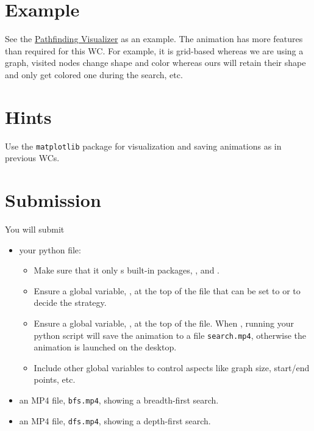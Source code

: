 \documentclass[a4paper]{exam}
\begin{document}
\section*{Example}
See the \href{https://clementmihailescu.github.io/Pathfinding-Visualizer/#}{Pathfinding Visualizer} as an example. The animation has more features than required for this WC. For example, it is grid-based whereas we are using a graph, visited nodes change shape and color whereas ours will retain their shape and only get colored one during the search, etc.

\section*{Hints}
Use the \texttt{matplotlib} package for visualization and saving animations as in previous WCs.


\section*{Submission}
You will submit
\begin{itemize}
\item your python file:
  \begin{itemize}
  \item Make sure that it only s built-in packages, , and .
  \item Ensure a global variable, , at the top of the file that can be set to  or  to decide the strategy.
  \item Ensure a global variable, , at the top of the file. When , running your python script will save the animation to a file \texttt{search.mp4}, otherwise the animation is launched on the desktop.
  \item Include other global variables to control aspects like graph size, start/end points, etc.
  \end{itemize}
\item an MP4 file, \texttt{bfs.mp4}, showing a breadth-first search. 
\item an MP4 file, \texttt{dfs.mp4}, showing a depth-first search. 
\end{itemize}
\end{document}
